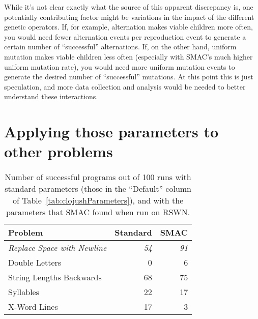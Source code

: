 While it's not clear exactly what  the source of this apparent discrepancy is,
one potentially contributing factor might be variations in the impact of the
different genetic operators. If, for example, alternation makes viable 
children more often, you would need fewer alternation events 
per reproduction event to generate a certain number of ``successful''
alternations. If, on the other hand, uniform mutation makes viable children 
less often (especially with SMAC's much higher uniform mutation rate), 
you would need more uniform mutation events to generate the
desired number of ``successful'' mutations. At this point this is just
speculation, and more data collection and analysis would be needed to better
understand these interactions.

\section{Applying those parameters to other problems}
\label{sec:applyingToOtherProblems}

%
%

\begin{table}[t]
\centering
\caption{Number of successful programs out of 100 runs with standard parameters (those in the ``Default'' column of Table~\ref{tab:clojushParameters}), and with the parameters that SMAC found when run on RSWN.}
\label{table:results}
\begin{tabular}{l r r}
\toprule
\textbf{Problem} & \textbf{Standard} & \textbf{SMAC} \tabularnewline
\midrule
\textit{Replace Space with Newline} & \textit{54} & \textit{91} \tabularnewline
Double Letters	& 0 & 6 \tabularnewline
String Lengths Backwards & 68 & 75 \tabularnewline
Syllables & 22 & 17 \tabularnewline
X-Word Lines & 17 & 3 \tabularnewline
\bottomrule
\end{tabular}
\end{table}

